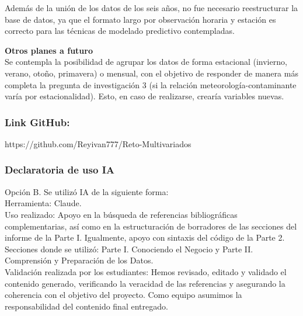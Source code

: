 \documentclass[
  letterpaper,
  DIV=11,
  numbers=noendperiod]{scrartcl}
\begin{document}
Además de la unión de los datos de los seis años, no fue necesario
reestructurar la base de datos, ya que el formato largo por observación
horaria y estación es correcto para las técnicas de modelado predictivo
contempladas.

\textbf{Otros planes a futuro}\\
Se contempla la posibilidad de agrupar los datos de forma estacional
(invierno, verano, otoño, primavera) o mensual, con el objetivo de
responder de manera más completa la pregunta de investigación 3 (si la
relación meteorología-contaminante varía por estacionalidad). Esto, en
caso de realizarse, crearía variables nuevas.

\subsubsection{Link GitHub:}\label{link-github}

https://github.com/Reyivan777/Reto-Multivariados

\subsubsection{Declaratoria de uso IA}\label{declaratoria-de-uso-ia}

Opción B. Se utilizó IA de la siguiente forma:\\
Herramienta: Claude.\\
Uso realizado: Apoyo en la búsqueda de referencias bibliográficas
complementarias, así como en la estructuración de borradores de las
secciones del informe de la Parte I. Igualmente, apoyo con sintaxis del
código de la Parte 2.\\
Secciones donde se utilizó: Parte I. Conociendo el Negocio y Parte II.
Comprensión y Preparación de los Datos.\\
Validación realizada por los estudiantes: Hemos revisado, editado y
validado el contenido generado, verificando la veracidad de las
referencias y asegurando la coherencia con el objetivo del proyecto.
Como equipo asumimos la responsabilidad del contenido final entregado.
\end{document}

